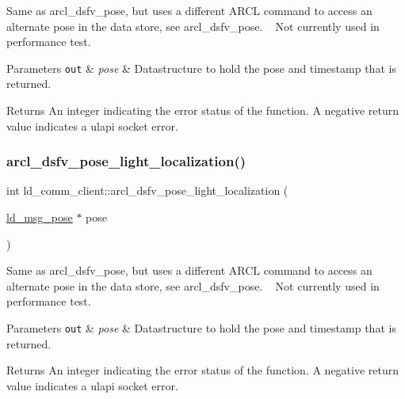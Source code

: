 Same as arcl\+\_\+dsfv\+\_\+pose, but uses a different A\+R\+CL command to access an alternate pose in the data store, see arcl\+\_\+dsfv\+\_\+pose. ~\newline
Not currently used in performance test. 
\begin{DoxyParams}[1]{Parameters}
\mbox{\tt out}  & {\em pose} & Datastructure to hold the pose and timestamp that is returned. \\
\hline
\end{DoxyParams}
\begin{DoxyReturn}{Returns}
An integer indicating the error status of the function. A negative return value indicates a ulapi socket error. 
\end{DoxyReturn}
\mbox{\label{classld__comm__client_a513a0bddf7967271eb3ba45d50f47fe6}} 
\subsubsection{\texorpdfstring{arcl\+\_\+dsfv\+\_\+pose\+\_\+light\+\_\+localization()}{arcl\_dsfv\_pose\_light\_localization()}}
{\footnotesize\ttfamily int ld\+\_\+comm\+\_\+client\+::arcl\+\_\+dsfv\+\_\+pose\+\_\+light\+\_\+localization (\begin{DoxyParamCaption}\item[{\hyperlink{structld__msg__pose}{ld\+\_\+msg\+\_\+pose} $\ast$}]{pose }\end{DoxyParamCaption})}

Same as arcl\+\_\+dsfv\+\_\+pose, but uses a different A\+R\+CL command to access an alternate pose in the data store, see arcl\+\_\+dsfv\+\_\+pose. ~\newline
Not currently used in performance test. 
\begin{DoxyParams}[1]{Parameters}
\mbox{\tt out}  & {\em pose} & Datastructure to hold the pose and timestamp that is returned. \\
\hline
\end{DoxyParams}
\begin{DoxyReturn}{Returns}
An integer indicating the error status of the function. A negative return value indicates a ulapi socket error. 
\end{DoxyReturn}
\mbox{\label{classld__comm__client_a9c0159e1ab1f6112e4ee9e14e2ae4975}} 
